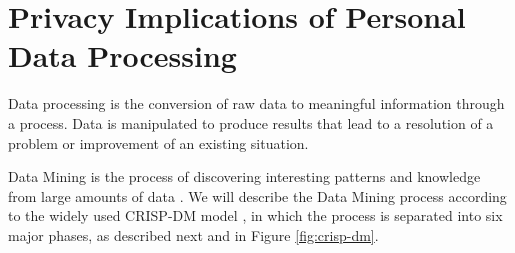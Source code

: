 
\section{Privacy Implications of Personal Data Processing} 
\label{sec:PrivacyImplicationsPersonalDataProcessing}


Data processing is the conversion of raw data to meaningful information through a process. Data is manipulated to produce results that lead to a resolution of a problem or improvement of an existing situation. 

Data Mining is the process of discovering interesting patterns and knowledge from large amounts of data \cite{han2011data}. We will describe the Data Mining process according to the widely used CRISP-DM model \cite{wirth2000crisp}, in which the process is separated into six major phases, as described next and in Figure \ref{fig:crisp-dm}.

